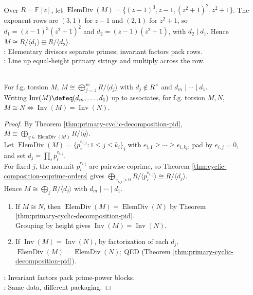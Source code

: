 \begin{example} \label{ex:elementary-divisors-to-invariant-factors-polynomial-module} \\
Over $R=\mathbb{F}[z]$, let $\operatorname{ElemDiv}(M)=\{(z-1)^3,z-1,(z^2+1)^2,z^2+1\}$. The exponent rows are $(3,1)$ for $z-1$ and $(2,1)$ for $z^2+1$, so $d_1=(z-1)^3(z^2+1)^2$ and $d_2=(z-1)(z^2+1)$, with $d_2\mid d_1$. Hence $M\cong R/\langle d_1\rangle\oplus R/\langle d_2\rangle$.\\
: Elementary divisors separate primes; invariant factors pack rows.\\
: Line up equal-height primary strings and multiply across the row.
\end{example}

\begin{theorem} \label{thm:pid-invariant-factor-decomposition} \\
For f.g. torsion $M$, $M\cong\bigoplus_{j=1}^mR/\langle d_j\rangle$ with $d_j\notin R^\times$ and $d_m\mid\cdots\mid d_1$.\\
Writing $\operatorname{Inv}(M)\defeq(d_m,\ldots,d_1)$ up to associates, for f.g. torsion $M,N$, $M\cong N\iff\operatorname{Inv}(M)=\operatorname{Inv}(N)$.
\begin{proof} By Theorem \ref{thm:primary-cyclic-decomposition-pid}, $M\cong\bigoplus_{q\in\operatorname{ElemDiv}(M)}R/\langle q\rangle$.\\
Let $\operatorname{ElemDiv}(M)=\{p_i^{e_{i,j}}:1\leq j\leq k_i\}_i$ with $e_{i,1}\geq\cdots\geq e_{i,k_i}$, pad by $e_{i,j}=0$, and set $d_j=\prod_ip_i^{e_{i,j}}$.\\
For fixed $j$, the nonunit $p_i^{e_{i,j}}$ are pairwise coprime, so Theorem \ref{thm:cyclic-composition-coprime-orders} gives $\bigoplus_{e_{i,j}>0}R/\langle p_i^{e_{i,j}}\rangle\cong R/\langle d_j\rangle$.\\
Hence $M\cong\bigoplus_jR/\langle d_j\rangle$ with $d_m\mid\cdots\mid d_1$.
\begin{enumerate}[label=\roman*.]
\setlength{\itemsep}{0pt}
\item[$(\Rightarrow)$] If $M\cong N$, then $\operatorname{ElemDiv}(M)=\operatorname{ElemDiv}(N)$ by Theorem \ref{thm:primary-cyclic-decomposition-pid}. \\
Grouping by height gives $\operatorname{Inv}(M)=\operatorname{Inv}(N)$.
\item[$(\Leftarrow)$] If $\operatorname{Inv}(M)=\operatorname{Inv}(N)$, by factorization of each $d_j$, $\operatorname{ElemDiv}(M)=\operatorname{ElemDiv}(N)$; QED (Theorem \ref{thm:primary-cyclic-decomposition-pid}).
\end{enumerate}
: Invariant factors pack prime-power blocks.\\
: Same data, different packaging.
\end{proof}
\end{theorem}

